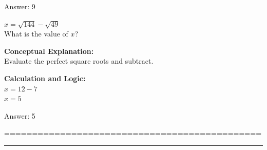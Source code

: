 \documentclass[11pt,paper=a4,answers]{exam}
\begin{document}
\begin{questions}
\begin{solution}
Answer: \colorbox{yellow!100}{9}
\end{solution}

\vspace{40pt}

\question
$x = \sqrt{144} - \sqrt{49}$ \\
What is the value of $x$?

\begin{solution}
\textbf{Conceptual Explanation:} \\
Evaluate the perfect square roots and subtract.

\vspace{20pt}

\textbf{Calculation and Logic:} \\
$x = 12 - 7$ \\
$x = 5$

\vspace{25pt}

Answer: \colorbox{yellow!100}{5}
\end{solution}
==============================================

\end{questions}
\begin{center}
\rule{.5\textwidth}{1pt}
\end{center}
\end{document}
